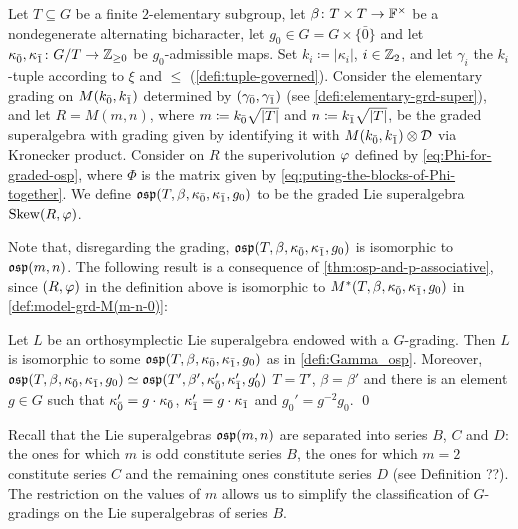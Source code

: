 \begin{defi}\label{defi:Gamma_osp}
    Let $T \subseteq G$ be a finite $2$-elementary subgroup, let $\beta\colon {T\times T} \to \mathbb{F}^\times$ be a nondegenerate alternating bicharacter, let $g_0 \in G = G\times \{ \bar 0 \}$ and let $\kappa_{\bar{0}}, \kappa_{\bar{1}} \colon G/T \to \mathbb{Z}_{\geq 0}$ be $g_0$-admissible maps. 
    Set $k_i \coloneqq |\kappa_i|$, $i\in \mathbb{Z}_2$, and let $\gamma_i$ the $k_i$-tuple according to $\xi$ and $\leq$ (\cref{defi:tuple-governed}). 
    Consider the elementary grading on $M(k_{\bar{0}}, k_{\bar{1}})$ determined by $(\gamma_{\bar{0}}, \gamma_{\bar{1}})$ (see \cref{defi:elementary-grd-super}), and let $R = M(m,n)$, where $m \coloneqq k_{\bar{0}} \sqrt{|T|}$ and $n \coloneqq k_{\bar{1}} \sqrt{|T|}$, be the graded superalgebra with grading given by identifying it with $M(k_{\bar{0}}, k_{\bar{1}}) \otimes \mathcal{D}$ via Kronecker product. 
    Consider on $R$ the superivolution $\varphi$ defined by \cref{eq:Phi-for-graded-osp}, where $\Phi$ is the matrix given by \cref{eq:puting-the-blocks-of-Phi-together}. 
    We define $\mathfrak{osp}(T, \beta, \kappa_{\bar{0}}, \kappa_{\bar{1}}, g_0)$ to be the graded Lie superalgebra $\operatorname{Skew}(R, \varphi)$. 
\end{defi}

Note that, disregarding the grading, $\mathfrak{osp}(T, \beta, \kappa_{\bar{0}}, \kappa_{\bar{1}}, g_0)$ is isomorphic to $\mathfrak{osp}(m,n)$.
The following result is a consequence of \cref{thm:osp-and-p-associative}, since $(R, \varphi)$ in the definition above is isomorphic to $M^*(T, \beta, \kappa_{\bar{0}}, \kappa_{\bar{1}}, g_0)$ in \cref{def:model-grd-M(m-n-0)}:

\begin{thm}\label{thm:grds-osp-final}
    Let $L$ be an orthosymplectic Lie superalgebra endowed with a $G$-grading. 
    Then $L$ is isomorphic to some $\mathfrak{osp}(T, \beta, \kappa_{\bar{0}}, \kappa_{\bar{1}}, g_0)$ as in \cref{defi:Gamma_osp}. 
    Moreover, $\mathfrak{osp}(T, \beta, \kappa_{\bar{0}}, \kappa_{\bar{1}}, g_0) \simeq \mathfrak{osp}(T', \beta', \kappa_{\bar{0}}', \kappa_{\bar{1}}', g_0')$ \IFF $T =T'$, $\beta = \beta'$ and there is an element $g \in G$ such that $\kappa_{\bar{0}}' = g\cdot\kappa_{\bar{0}}$, $\kappa_{\bar{1}}' = g\cdot\kappa_{\bar{1}}$ and $g_0' = g^{-2}g_0$. \qed
\end{thm}

Recall that the Lie superalgebras $\mathfrak{osp}(m,n)$ are separated into series $B$, $C$ and $D$: the ones for which $m$ is odd constitute series $B$, the ones for which $m = 2$ constitute series $C$ and the remaining ones constitute series $D$ (see Definition ??). 
The restriction on the values of $m$ allows us to simplify the classification of $G$-gradings on the Lie superalgebras of series $B$. 

